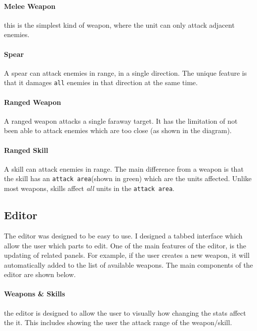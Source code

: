 \paragraph{Melee Weapon} this is the simplest kind of weapon, where the unit can only attack adjacent enemies.

\paragraph{Spear} A spear can attack  enemies in range, in a single direction. The unique feature is that it damages \texttt{all} enemies in that direction at the same time.

\paragraph{Ranged Weapon} A ranged weapon attacks a single faraway target. It has the limitation of not been able to attack enemies which are too close (as shown in the diagram). 

\paragraph{Ranged Skill} A skill can attack  enemies in range. The main difference from a weapon is that the skill has an \texttt{attack area}(shown in green) which are the units affected. Unlike most weapons, skills affect \emph{all} units in the \texttt{attack area}.

\clearpage
\subsection{Editor}
The editor was designed to be easy to use. I designed a tabbed interface which allow the user which parts to edit.  One of the main features of the editor, is the updating of related panels. For example, if the user creates a new weapon, it will automatically added to the list of available weapons. 
The main components of the editor are shown below.

\paragraph{Weapons \& Skills} the editor is designed to allow the user to visually how changing the stats affect the it. This includes showing the user the attack range of the weapon/skill.

